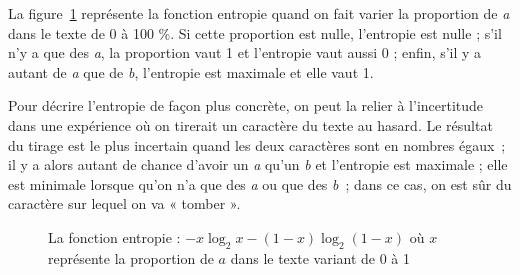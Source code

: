 \documentclass[]{article}
\begin{document}
La figure~\ref{entropie} représente la fonction entropie quand on fait varier la proportion de \textit{a} dans le texte de 0 à 100 \%. Si cette proportion est nulle, l'entropie est nulle ; s'il n'y a que des \textit{a}, la proportion vaut 1 et l'entropie vaut aussi 0 ; enfin, s'il y a autant de \textit{a} que de \textit{b}, l'entropie est maximale et elle vaut 1.  

Pour décrire l'entropie de façon plus concrète, on peut la relier à l'incertitude dans une expérience où on tirerait un caractère du texte au hasard.  Le résultat du tirage est le plus incertain quand les deux caractères sont en nombres égaux~; il y a alors autant de chance d'avoir un \textit{a} qu'un \textit{b} et l'entropie est maximale ; elle est minimale lorsque qu'on n'a que des \textit{a} ou que des \textit{b}~; dans ce cas, on est  sûr du caractère sur lequel on va « tomber ».

\begin{figure}
\tikzset{
    xmin/.store in=\xmin, xmin/.default=-3, xmin=-3,
    xmax/.store in=\xmax, xmax/.default=3, xmax=3,
    ymin/.store in=\ymin, ymin/.default=-3, ymin=-3,
    ymax/.store in=\ymax, ymax/.default=3, ymax=3,
}
\newcommand {\grille}
    {\draw[help lines] (\xmin,\ymin) grid (\xmax,\ymax);}
\newcommand {\axes} {
    \draw[->] (\xmin,0) -- (\xmax,0);
    \draw[->] (0,\ymin) -- (0,\ymax);
}
\newcommand {\fenetre}
    {\clip (\xmin,\ymin) rectangle (\xmax,\ymax);}

\begin{center}
\scalebox{2}
{}
\end{center}
\caption{La fonction entropie : $-x \log_2 x -(1 - x) \log_2 (1 - x)$ où $x$ représente la proportion de $a$ dans le texte variant de 0 à 1}
\label{entropie}
\end{figure}
\end{document}

